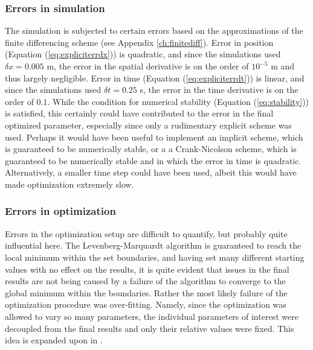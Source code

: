 \documentclass[letterpaper,titlepage,oneside]{report}
\begin{document}
\subsubsection*{Errors in simulation}
The simulation is subjected to certain errors based on the approximations
of the finite differencing scheme (see Appendix \ref{ch:finitediff}).
Error in position (Equation (\ref{eq:expliciterrdx})) is quadratic, and since
the simulations used $\delta x = 0.005$ m, the error in the spatial
derivative is on the order of $10^{-5}$ m and thus largely negligible.
Error in time (Equation (\ref{eq:expliciterrdt})) is linear, and since
the simulations used $\delta t = 0.25$ s, the error in the time derivative
is on the order of $0.1$. While the condition for numerical stability
(Equation (\ref{eq:stability})) is
satisfied, this certainly could have contributed to the
error in the final optimized parameter, especially since only a rudimentary
explicit scheme was used. Perhaps it would have been useful to implement
an implicit scheme, which is guaranteed to be numerically stable, or a
a Crank-Nicolson scheme, which is guaranteed to be numerically stable and
in which the error in time is quadratic.
Alternatively, a smaller time step could have been used, albeit this would
have made optimization extremely slow.

\subsubsection*{Errors in optimization}
Errors in the optimization setup are difficult to quantify, but probably
quite influential here. The Levenberg-Marquardt algorithm is guaranteed
to reach the local minimum within the set boundaries, and having set
many different starting values with no effect on the results, it is quite
evident that issues in the final results are not being caused by a failure
of the algorithm to converge to the global minimum within the boundaries.
Rather the most likely failure of the optimization procedure was over-fitting.
Namely, since the optimization was allowed to vary so many parameters, the
individual parameters of interest were decoupled from the final results
and only their relative values were fixed. This idea is expanded upon in
.
\end{document}
